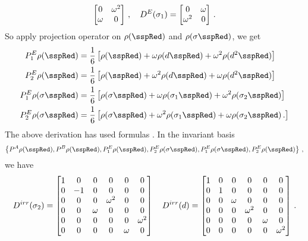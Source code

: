 {\begin{equation}
    \begin{bmatrix}
      0 & \omega^2 \\
      \omega & 0 \\
    \end{bmatrix}  \,,\quad
    D^E(\sigma_{1}) =
    \begin{bmatrix}
      0 & \omega  \\
      \omega^2 & 0 \\
    \end{bmatrix}  \,.
    \label{eq:c3E_2}
  \end{equation}
  So apply projection operator  on $\rho(\sspRed)$ and
  $\rho(\Refl\sspRed)$, we get
  \begin{align}
    P^E_1\rho(\sspRed)
    & = \frac{1}{6}
      \left[
      \rho(\sspRed) + \omega \rho(\shift \sspRed) + \omega^2 \rho(\shift^2 \sspRed)
      \right] \\
    P^E_2\rho(\sspRed)
    & = \frac{1}{6}
      \left[
      \rho(\sspRed) + \omega^2 \rho(\shift \sspRed) + \omega \rho(\shift^2 \sspRed)
      \right]  \\
    P^E_1\rho(\Refl\sspRed)
    & = \frac{1}{6}
      \left[
      \rho(\Refl\sspRed) + \omega \rho(\Refl_{1} \sspRed) + \omega^2 \rho(\Refl_{2} \sspRed)
      \right] \\
    P^E_2\rho(\Refl\sspRed)
    & = \frac{1}{6}
      \left[
      \rho(\Refl\sspRed) + \omega^2 \rho(\Refl_{1} \sspRed) + \omega \rho(\Refl_{2} \sspRed)
      \,.
      \right]
  \end{align}
  The above derivation has used formulas .
  In the invariant basis
  \[
    \left\{
      P^A\rho(\sspRed), P^B\rho(\sspRed), P^E_1\rho(\sspRed), P^E_2\rho(\Refl\sspRed),
      P^E_1\rho(\Refl\sspRed),  P^E_2\rho(\sspRed)
    \right\}
    \,,
  \]
  we have
  \[
    D^{irr}(\sigma_{2}) =
    \begin{bmatrix}
      1 & 0 & 0 & 0 & 0 & 0 \\
      0 & -1 & 0 & 0 & 0 & 0 \\
      0 & 0 & 0 & \omega^2 & 0 & 0 \\
      0 & 0 & \omega & 0 & 0 & 0 \\
      0 & 0 & 0 & 0 & 0 & \omega^2 \\
      0 & 0 & 0 & 0 & \omega & 0 \\
    \end{bmatrix}
    \quad
    D^{irr}(d) =
    \begin{bmatrix}
      1 & 0 & 0 & 0 & 0 & 0 \\
      0 & 1 & 0 & 0 & 0 & 0 \\
      0 & 0 & \omega & 0 & 0 & 0 \\
      0 & 0 & 0 & \omega^2 & 0 & 0 \\
      0 & 0 & 0 & 0 & \omega & 0 \\
      0 & 0 & 0 & 0 & 0 & \omega^2 \\
    \end{bmatrix}
    \,.
  \]
\authorXD{}
} %
